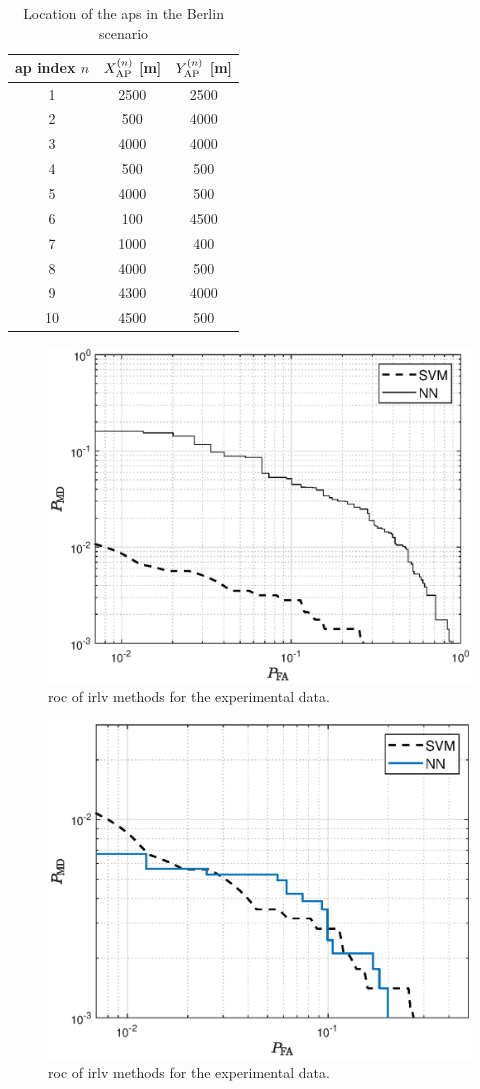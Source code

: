 \documentclass[draftcls,onecolumn,12pt]{IEEEtran}
\begin{document}
{\begin{table}
\centering
\caption{Location of the \acp{ap} in the Berlin scenario}
\label{tab:berlin}
\begin{tabular}{c c c}
\toprule
\ac{ap} index $n$ & $X_{\rm AP}^{(n)}$ [m] & $Y_{\rm AP}^{(n)}$ [m] \\
\midrule
1 & 2500 & 2500 \\
2 & 500 & 4000 \\
3 & 4000 & 4000 \\
4 & 500 & 500 \\
5 & 4000 & 500 \\
6 & 100 & 4500 \\
7 & 1000 & 400 \\
8 & 4000 & 500 \\
9 & 4300 & 4000 \\
10 & 4500 & 500 \\
\bottomrule
\end{tabular}
\end{table}

\begin{figure}[t]
    \centering
    \includegraphics[width=0.6\columnwidth]{berlin.eps}
    \caption{\ac{roc} of \ac{irlv} methods for the experimental data.}
    \label{fig:Berlin}
\end{figure}

\begin{figure}[t]
    \centering
    \includegraphics[width=0.6\columnwidth]{berlinNew.eps}
    \caption{\ac{roc} of \ac{irlv} methods for the experimental data.}
    \label{fig:Berlinnew}
\end{figure}

}
\end{document}
